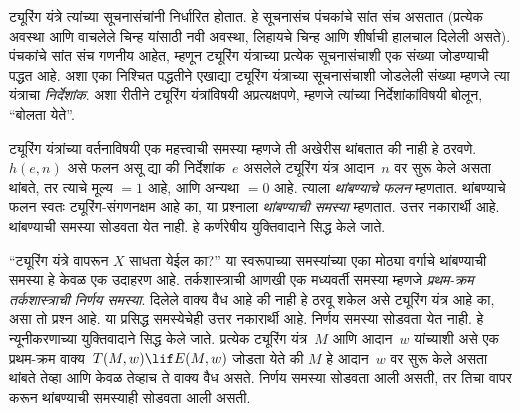 ट्यूरिंग यंत्रे त्यांच्या सूचनासंचांनी निर्धारित होतात. हे सूचनासंच पंचकांचे सांत संच असतात (प्रत्येक अवस्था आणि वाचलेले चिन्ह यांसाठी नवी अवस्था, लिहायचे चिन्ह आणि शीर्षाची हालचाल दिलेली असते). पंचकांचे सांत संच गणनीय आहेत, म्हणून ट्यूरिंग यंत्राच्या प्रत्येक सूचनासंचाशी एक संख्या जोडण्याची पद्धत आहे. अशा एका निश्चित पद्धतीने एखाद्या ट्यूरिंग यंत्राच्या सूचनासंचाशी जोडलेली संख्या म्हणजे त्या यंत्राचा \emph{निर्देशांक}. अशा रीतीने ट्यूरिंग यंत्रांविषयी अप्रत्यक्षपणे, म्हणजे त्यांच्या निर्देशांकांविषयी बोलून, ``बोलता येते''.

ट्यूरिंग यंत्रांच्या वर्तनाविषयी एक महत्त्वाची समस्या म्हणजे ती अखेरीस थांबतात की नाही हे ठरवणे. $h(e, n)$ असे फलन असू द्या की निर्देशांक~$e$ असलेले ट्यूरिंग यंत्र आदान~$n$ वर सुरू केले असता थांबते, तर त्याचे मूल्य $= 1$ आहे, आणि अन्यथा $=0$ आहे. त्याला \emph{थांबण्याचे फलन} म्हणतात. थांबण्याचे फलन स्वतः ट्यूरिंग-संगणनक्षम आहे का, या प्रश्नाला \emph{थांबण्याची समस्या} म्हणतात. उत्तर नकारार्थी आहे. थांबण्याची समस्या सोडवता येत नाही. हे कर्णरेषीय युक्तिवादाने सिद्ध केले जाते.

``ट्यूरिंग यंत्रे वापरून $X$ साधता येईल का?'' या स्वरूपाच्या समस्यांच्या एका मोठ्या वर्गाचे थांबण्याची समस्या हे केवळ एक उदाहरण आहे. तर्कशास्त्राची आणखी एक मध्यवर्ती समस्या म्हणजे \emph{प्रथम-क्रम तर्कशास्त्राची निर्णय समस्या}. दिलेले वाक्य वैध आहे की नाही हे ठरवू शकेल असे ट्यूरिंग यंत्र आहे का, असा तो प्रश्न आहे. या प्रसिद्ध समस्येचेही उत्तर नकारार्थी आहे. निर्णय समस्या सोडवता येत नाही. हे न्यूनीकरणाच्या युक्तिवादाने सिद्ध केले जाते. प्रत्येक ट्यूरिंग यंत्र~$M$ आणि आदान~$w$ यांच्याशी असे एक प्रथम-क्रम वाक्य~$T(M, w) \lif E(M, w)$ जोडता येते की $M$ हे आदान~$w$ वर सुरू केले असता थांबते तेव्हा आणि केवळ तेव्हाच ते वाक्य वैध असते. निर्णय समस्या सोडवता आली असती, तर तिचा वापर करून थांबण्याची समस्याही सोडवता आली असती.
